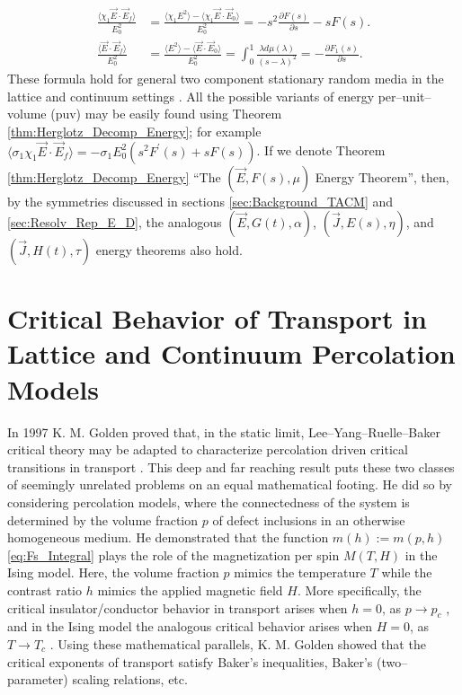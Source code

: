 \documentclass[english,12pt,jmp,graphicx]{revtex4-1}
\begin{document}
%
\begin{align*}
  \frac{\langle\chi_1\vec{E}\cdot\vec{E}_f\rangle}{E_0^2}&=\frac{\langle\chi_1E^2\rangle-\langle\chi_1\vec{E}\cdot\vec{E}_0\rangle}{E_0^2}        
        =-s^2\frac{\partial F(s)}{\partial s}-sF(s).\\
  \frac{\langle\vec{E}\cdot\vec{E}_f\rangle}{E_0^2}&=\frac{\langle E^2\rangle-\langle\vec{E}\cdot\vec{E}_0\rangle}{E_0^2}
     =\int_0^1\frac{\lambda d\mu(\lambda)}{(s-\lambda)^2}=-\frac{\partial F_1(s)}{\partial s}.
\end{align*}
%
These formula hold for general two component stationary random media in
the lattice and continuum settings \cite{Golden:PRL-3935}.
%
All the possible variants of energy per--unit--volume (puv) may be
easily found using Theorem \ref{thm:Herglotz_Decomp_Energy}; for
example $\langle\sigma_1\chi_1\vec{E}\cdot\vec{E}_f\rangle=-\sigma_1E_0^2(s^2F^\prime(s)+sF(s))$. If we
denote Theorem \ref{thm:Herglotz_Decomp_Energy} ``The 
$(\vec{E},F(s),\mu)$ Energy Theorem'', then, by the symmetries discussed in
sections \ref{sec:Background_TACM} and \ref{sec:Resolv_Rep_E_D}, the analogous
$(\vec{E},G(t),\alpha)$, $(\vec{J},E(s),\eta)$, and $(\vec{J},H(t),\tau)$ energy
theorems also hold.
%

\section{Critical Behavior of Transport in Lattice and Continuum
  Percolation Models}
\label{sec:Crit_Behav_of_Transport}
%
In 1997 K. M. Golden proved that, in the static limit,
Lee--Yang--Ruelle--Baker critical theory may be adapted to
characterize percolation driven critical transitions in transport  
\cite{Golden:PRL-3935}. This deep and far reaching result puts these
two classes of seemingly unrelated problems on an equal mathematical
footing. He did so by considering percolation models, where the
connectedness of the system is determined by the volume fraction $p$
of defect inclusions in an otherwise homogeneous medium. He
demonstrated that the function $m(h):=m(p,h)$ \eqref{eq:Fs_Integral}
plays the role of the magnetization per spin $M(T,H)$ in the Ising
model. Here, the volume fraction $p$ mimics the temperature $T$
while the contrast ratio $h$ mimics the applied magnetic field
$H$. More specifically, the critical insulator/conductor behavior in
transport arises when $h=0$, as $p\to p_c$ \cite{Golden:PRL-3935}, and
in the Ising model the analogous critical behavior arises when $H=0$,
as $T\to T_c$ \cite{Christensen-2005}. Using these mathematical
parallels, K. M. Golden showed that the critical exponents of
transport satisfy Baker's inequalities, Baker's (two--parameter) scaling
relations, etc.
\end{document}

